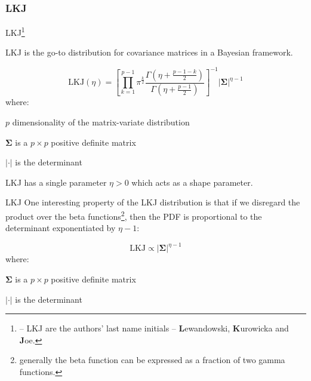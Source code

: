 \subsubsection*{LKJ}
\begin{frame}[noframenumbering]{LKJ\footnote{
			\textcite{lewandowski2009generating} --
			LKJ are the authors' last name initials -- \textbf{L}ewandowski, \textbf{K}urowicka and \textbf{J}oe.
		}}

	LKJ is the go-to distribution for covariance matrices in a Bayesian framework.

	$$
		\text{LKJ} (\eta) = \left[\prod_{k=1}^{p-1}\pi^{\frac{k}{2}}
			\frac{\Gamma\left(\eta+\frac{p-1-k}{2}\right)}{\Gamma\left(\eta+\frac{p-1}{2}\right)}\right]^{-1}
		|\boldsymbol{\Sigma}|^{\eta-1}
	$$
	where:
	\begin{vfilleditems}
		\item $p$ dimensionality of the matrix-variate distribution
		\item $\boldsymbol{\Sigma}$ is a $p \times p$ positive definite matrix
		\item $\left| \cdot \right|$ is the determinant
	\end{vfilleditems}
	\vfill
	LKJ has a single parameter $\eta > 0$ which acts as a shape parameter.
\end{frame}

\begin{frame}[noframenumbering]{LKJ}
	One interesting property of the LKJ distribution is that
	if we disregard the product over the beta functions\footnote{
		generally the beta function can be expressed as a fraction of
		two gamma functions.
	},
	then the PDF is proportional to the determinant exponentiated by $\eta - 1$:

	$$
		\text{LKJ} \propto \left|\boldsymbol{\Sigma}\right|^{\eta - 1}
	$$
	where:
	\begin{vfilleditems}
		\item $\boldsymbol{\Sigma}$ is a $p \times p$ positive definite matrix
		\item $\left| \cdot \right|$ is the determinant
	\end{vfilleditems}

\end{frame}

